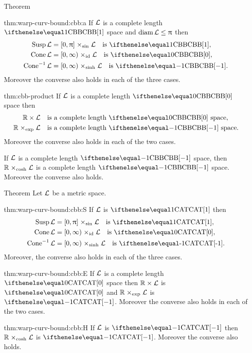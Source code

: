 \begin{thm}{Theorem}\label{thm:warp-curv-bound:cbb}
\begin{subthm}{thm:warp-curv-bound:cbb:a}
If $\mathcal{L}$ is a complete length $\Alex{1}$ space and $\diam\spc{L}\le\pi$
then 
\begin{align*}
\Susp\spc{L}&=[0,\pi]\warp{\sin}\spc{L}\quad\text{is  $\Alex1$},
\\
\Cone\spc{L}&=[0,\infty)\warp{\id}\spc{L}\quad\text{is  $\Alex0$},
\\
\Cone\mc{-1}\spc{L}&=[0,\infty)\warp{\sinh}\spc{L}\quad\text{is  $\Alex{-1}$}.
\end{align*}
Moreover the converse also holds in each of the three cases.
\end{subthm}

\begin{subthm}{thm:cbb-product}
If $\mathcal{L}$ is a complete length $\Alex0$ space
then 
\begin{align*}
\RR\times\spc{L}&\quad\text{is a complete length $\Alex0$ space},
\\
\RR\warp{\exp}\spc{L}&\quad\text{is a complete length $\Alex{-1}$ space.}
\end{align*}
Moreover the converse also holds in each of the two cases.
\end{subthm}

\begin{subthm}{}
If $\mathcal{L}$ is a complete length $\Alex{-1}$ space,
then $\RR\warp{\cosh}\spc{L}$ is a complete length $\Alex{-1}$ space.
Moreover the converse also holds.
\end{subthm}
\end{thm}


\begin{thm}{Theorem}\label{thm:warp-curv-bound:cat}
Let $\mathcal{L}$ be a metric space.
\begin{subthm}{thm:warp-curv-bound:cbb:S}
If $\mathcal{L}$ is $\CAT{1}$
then 
\begin{align*}
\Susp\spc{L}&=[0,\pi]\warp{\sin}\spc{L}\quad\text{is  \CAT{1}},
\\
\Cone\spc{L}&=[0,\infty)\warp{\id}\spc{L}\quad\text{is  \CAT{0}},
\\
\Cone\mc{-1}\spc{L}&=[0,\infty)\warp{\sinh}\spc{L}\quad\text{is  \CAT{-1}}.
\end{align*}
Moreover, the converse also holds in each of the three cases.
\end{subthm}

\begin{subthm}{thm:warp-curv-bound:cbb:E}
If $\mathcal{L}$ is a complete length $\CAT0$ space
then 
$\RR\times\spc{L}$ is $\CAT0$ 
and 
$\RR\warp{\exp}\spc{L}$ is $\CAT{-1}$.
Moreover the converse also holds in each of the two cases.
\end{subthm}

\begin{subthm}{thm:warp-curv-bound:cbb:H}
If $\mathcal{L}$ is $\CAT{-1}$
then 
$\RR\warp{\cosh}\spc{L}$
is $\CAT{-1}$.
Moreover the converse also holds.
\end{subthm}
\end{thm}

